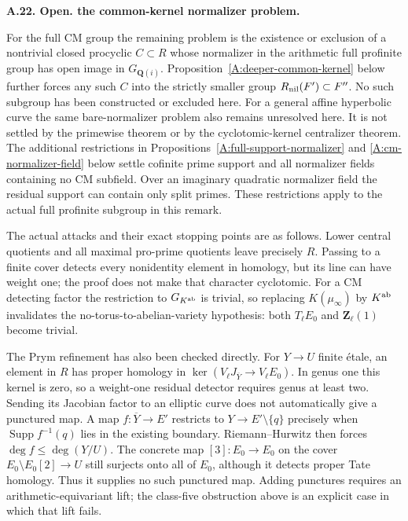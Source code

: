 \documentclass[11pt,oneside]{article}
\makeatletter
\newcounter{statementanchor}
\newenvironment{statement}[3]{%
 \refstepcounter{statementanchor}\def\@currentlabel{#1}%
 \par\addvspace{9pt}\noindent
 \textbf{#1. #2. #3.}\par\nobreak\noindent\ignorespaces
}{\par\addvspace{5pt}}
\makeatother
\begin{document}
\begin{statement}{A.22}{Open}{the common-kernel normalizer problem}
\label{st:A.22}
\label{A:cm-common-kernel}
For the full CM group the remaining problem is
the existence or exclusion of a nontrivial
closed procyclic $C\subset R$ whose normalizer
in the arithmetic full profinite group has
open image in $G_{\mathbf Q(i)}$. Proposition~\ref{A:deeper-common-kernel}
below further forces any such $C$ into the strictly smaller
group $R_{\rm nil}(F')\subset F''$. No such
subgroup has been constructed or excluded
here.  For a general affine hyperbolic curve
the same bare-normalizer problem also remains
unresolved here.  It is not settled by the
primewise theorem or by the cyclotomic-kernel
centralizer theorem.
The additional restrictions in
Propositions~\ref{A:full-support-normalizer} and
\ref{A:cm-normalizer-field} below settle cofinite prime support
and all normalizer fields containing no CM subfield. Over an
imaginary quadratic normalizer field the residual support
can contain only split primes. These restrictions apply
to the actual full profinite subgroup in this remark.

The actual attacks and their exact stopping
points are as follows.  Lower central
quotients and all maximal pro-prime quotients
leave precisely $R$.  Passing to a finite
cover detects every nonidentity element in
homology, but its line can have weight one;
the proof does not make that character
cyclotomic.  For a CM detecting factor the
restriction to $G_{K^{\rm ab}}$ is trivial,
so replacing $K(\mu_\infty)$ by $K^{\rm ab}$
invalidates the no-torus-to-abelian-variety
hypothesis: both $T_\ell E_0$ and
$\mathbf Z_\ell(1)$ become trivial.

The Prym refinement has also been checked
directly.  For $Y\to U$ finite \'etale,
an element in $R$ has proper homology in
$\ker(V_\ell J_{\overline Y}\to V_\ell E_0)$.
In genus one this kernel is zero, so a
weight-one residual detector requires genus
at least two.  Sending its Jacobian factor
to an elliptic curve does not automatically
give a punctured map.  A map
$f:\overline Y\to E'$ restricts to
$Y\to E'\setminus\{q\}$ precisely when
$\operatorname{Supp}f^{-1}(q)$ lies in the
existing boundary.  Riemann--Hurwitz then
forces $\deg f\leq\deg(Y/U)$.  The concrete
map $[3]:E_0\to E_0$ on the cover
$E_0\setminus E_0[2]\to U$ still surjects
onto all of $E_0$, although it detects
proper Tate homology.  Thus it supplies
no such punctured map.  Adding punctures
requires an arithmetic-equivariant lift;
the class-five obstruction above is an
explicit case in which that lift fails.


\end{statement}
\end{document}
